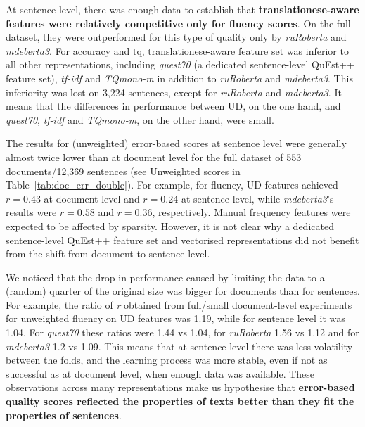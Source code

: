 At sentence level, there was enough data to establish that \textbf{translationese-aware features were relatively competitive only for fluency scores}. On the full dataset, they were outperformed for this type of quality only by \textit{ruRoberta} and \textit{mdeberta3}. For accuracy and tq, translationese-aware feature set was inferior to all other representations, including \textit{quest70} (a dedicated sentence-level QuEst++ feature set), \textit{tf-idf} and \textit{TQmono-m} in addition to \textit{ruRoberta} and \textit{mdeberta3}. This inferiority was lost on 3,224 sentences, except for \textit{ruRoberta} and \textit{mdeberta3}. It means that the differences in performance between UD, on the one hand, and \textit{quest70}, \textit{tf-idf} and \textit{TQmono-m}, on the other hand, were small. 

\label{pg:downward_slide}
The results for (unweighted) error-based scores at sentence level were generally almost twice lower than at document level for the full dataset of 553 documents/12,369 sentences (see Unweighted scores in Table~\ref{tab:doc_err_double}). For example, for fluency, UD features achieved $r=0.43$ at document level and $r=0.24$ at sentence level, while \textit{mdeberta3}'s results were $r=0.58$ and $r=0.36$, respectively. Manual frequency features were expected to be affected by sparsity. However, it is not clear why a dedicated sentence-level QuEst++ feature set and vectorised representations did not benefit from the shift from document to sentence level.

We noticed that the drop in performance caused by limiting the data to a (random) quarter of the original size was bigger for documents than for sentences. For example, the ratio of \textit{r} obtained from full/small document-level experiments for unweighted fluency on UD features was 1.19, while for sentence level it was 1.04. For \textit{quest70} these ratios were 1.44 vs 1.04, for \textit{ruRoberta} 1.56 vs 1.12 and for \textit{mdeberta3} 1.2 vs 1.09.
This means that at sentence level there was less volatility between the folds, and the learning process was more stable, even if not as successful as at document level, when enough data was available. 
These observations across many representations make us hypothesise that \textbf{error-based quality scores reflected the properties of texts better than they fit the properties of sentences}. 
\vspace{-1.5em}

